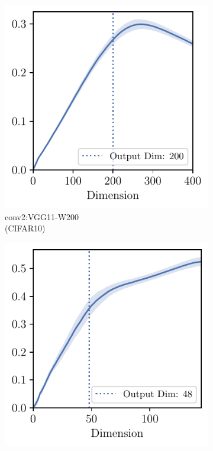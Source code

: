 \begin{figure}[h]
    \centering
    \begin{subfigure}[b]{0.23\textwidth}
        \centering
        \captionsetup{justification=centering}
        \includegraphics[width=\textwidth]{Appendix_Figures/Overlap_large_model/FailCases/late/CIFAR10_VGG11W200_fxlr0.01_conv2.pdf}
        \caption{conv2:VGG11-W200\\(CIFAR10)}
        \label{fig:app_adexp_overlap_late_vgg_cifar10}
    \end{subfigure}
    \begin{subfigure}[b]{0.23\textwidth}
        \centering
        \captionsetup{justification=centering}
        \includegraphics[width=\textwidth]{Appendix_Figures/Overlap_large_model/FailCases/late/CIFAR100_VGG11W48New_nobn_fixlr0.01_conv7.pdf}

\end{subfigure}
\end{figure}
